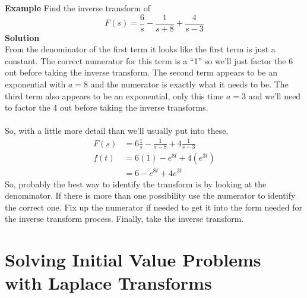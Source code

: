 \documentclass[10pt,reqno]{book}
\theoremstyle{definition}
\begin{document}
	
	\noindent \textbf{Example} Find the inverse transform of
	\[ F(s) = \frac{6}{s} - \frac{1}{s+8} + \frac{4}{s-3} \]
	\textbf{Solution}\\
	From the denominator of the first term it looks like the first term is just a constant. The correct numerator for this term is a ``1'' so we'll just factor the 6 out before taking the inverse transform. The second term appears to be an exponential with $ a = 8 $ and the numerator is exactly what it needs to be. The third term also appears to be an exponential, only this time $ a = 3 $ and we'll need to factor the 4 out before taking the inverse transforms.\\ \\ 
	So, with a little more detail than we'll usually put into these,
	\begin{align*}
	F(s) &= 6\frac{1}{s} - \frac{1}{s - 8}+ 4\frac{1}{s - 3}\\
		f(t) &= 6 (1) - e^{8t} + 4(e^{3t})\\
		&= 6 - e^{8t} + 4e^{3t}
	\end{align*}
	So, probably the best way to identify the transform is by looking at the denominator. If there is more than one possibility use the numerator to identify the correct one.  Fix up the numerator if needed to get it into the form needed for the inverse transform process. Finally, take the inverse transform.
	
	\section{Solving Initial Value Problems with Laplace Transforms}
	
\end{document}
